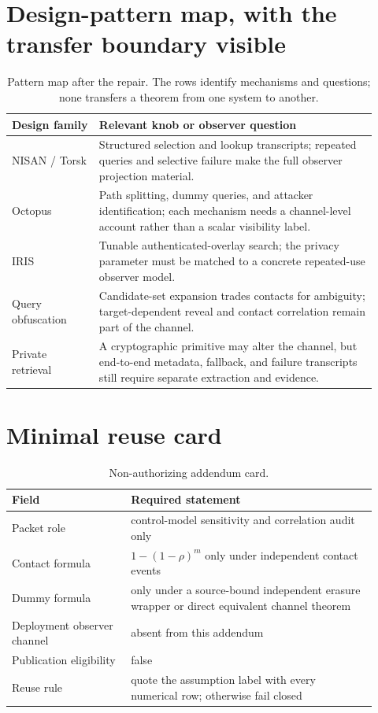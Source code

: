 \documentclass[11pt]{article}
\begin{document}
\section{Design-pattern map, with the transfer boundary visible}\label{sec:patterns}
\begin{table}[H]
\centering
\small
\begin{tabular}{@{}p{0.22\linewidth}p{0.70\linewidth}@{}}
\toprule
Design family & Relevant knob or observer question\\
\midrule
NISAN / Torsk & Structured selection and lookup transcripts; repeated queries and selective failure make the full observer projection material.\cite{panchenko2009nisan,mclachlan2009torsk,wang2010lookup}\\
Octopus & Path splitting, dummy queries, and attacker identification; each mechanism needs a channel-level account rather than a scalar visibility label.\cite{wang2012octopus}\\
IRIS & Tunable authenticated-overlay search; the privacy parameter must be matched to a concrete repeated-use observer model.\cite{aktypi2025iris}\\
Query obfuscation & Candidate-set expansion trades contacts for ambiguity; target-dependent reveal and contact correlation remain part of the channel.\cite{daniel2025queryobfuscation}\\
Private retrieval & A cryptographic primitive may alter the channel, but end-to-end metadata, fallback, and failure transcripts still require separate extraction and evidence.\\
\bottomrule
\end{tabular}
\caption{Pattern map after the repair. The rows identify mechanisms and questions; none transfers a theorem from one system to another.}
\label{tab:pattern-map}
\end{table}

\section{Minimal reuse card}\label{sec:card}
\begin{table}[H]
\centering
\small
\begin{tabular}{@{}p{0.30\linewidth}p{0.62\linewidth}@{}}
\toprule
Field & Required statement\\
\midrule
Packet role & control-model sensitivity and correlation audit only\\
Contact formula & \(1-(1-\rho)^m\) only under independent contact events\\
Dummy formula & only under a source-bound independent erasure wrapper or direct equivalent channel theorem\\
Deployment observer channel & absent from this addendum\\
Publication eligibility & false\\
Reuse rule & quote the assumption label with every numerical row; otherwise fail closed\\
\bottomrule
\end{tabular}
\caption{Non-authorizing addendum card.}
\label{tab:addendum-card}
\end{table}
\end{document}
